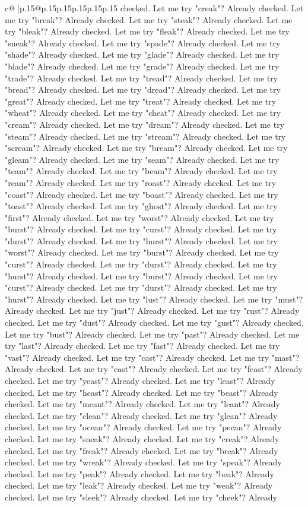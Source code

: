 \documentclass{article}
\begin{document}
{\begin{supertabular}{c@{$\;$}|p{.15\linewidth}@{}p{.15\linewidth}p{.15\linewidth}p{.15\linewidth}p{.15\linewidth}p{.15\linewidth}}
{{{checked. Let me try "creak"? Already checked. Let me try "break"? Already checked. Let me try "steak"? Already checked. Let me try "bleak"? Already checked. Let me try "fleak"? Already checked. Let me try "sneak"? Already checked. Let me try "spade"? Already checked. Let me try "shade"? Already checked. Let me try "glade"? Already checked. Let me try "blade"? Already checked. Let me try "grade"? Already checked. Let me try "trade"? Already checked. Let me try "tread"? Already checked. Let me try "bread"? Already checked. Let me try "dread"? Already checked. Let me try "great"? Already checked. Let me try "treat"? Already checked. Let me try "wheat"? Already checked. Let me try "cheat"? Already checked. Let me try "cream"? Already checked. Let me try "dream"? Already checked. Let me try "steam"? Already checked. Let me try "stream"? Already checked. Let me try "scream"? Already checked. Let me try "bream"? Already checked. Let me try "gleam"? Already checked. Let me try "seam"? Already checked. Let me try "team"? Already checked. Let me try "beam"? Already checked. Let me try "ream"? Already checked. Let me try "roast"? Already checked. Let me try "coast"? Already checked. Let me try "boast"? Already checked. Let me try "toast"? Already checked. Let me try "ghost"? Already checked. Let me try "first"? Already checked. Let me try "worst"? Already checked. Let me try "burst"? Already checked. Let me try "curst"? Already checked. Let me try "durst"? Already checked. Let me try "hurst"? Already checked. Let me try "worst"? Already checked. Let me try "burst"? Already checked. Let me try "curst"? Already checked. Let me try "durst"? Already checked. Let me try "hurst"? Already checked. Let me try "burst"? Already checked. Let me try "curst"? Already checked. Let me try "durst"? Already checked. Let me try "hurst"? Already checked. Let me try "lust"? Already checked. Let me try "must"? Already checked. Let me try "just"? Already checked. Let me try "rust"? Already checked. Let me try "dust"? Already checked. Let me try "gust"? Already checked. Let me try "bust"? Already checked. Let me try "past"? Already checked. Let me try "last"? Already checked. Let me try "fast"? Already checked. Let me try "vast"? Already checked. Let me try "cast"? Already checked. Let me try "mast"? Already checked. Let me try "east"? Already checked. Let me try "feast"? Already checked. Let me try "yeast"? Already checked. Let me try "least"? Already checked. Let me try "heast"? Already checked. Let me try "beast"? Already checked. Let me try "meant"? Already checked. Let me try "leant"? Already checked. Let me try "clean"? Already checked. Let me try "glean"? Already checked. Let me try "ocean"? Already checked. Let me try "pecan"? Already checked. Let me try "sneak"? Already checked. Let me try "creak"? Already checked. Let me try "freak"? Already checked. Let me try "break"? Already checked. Let me try "wreak"? Already checked. Let me try "speak"? Already checked. Let me try "peak"? Already checked. Let me try "beak"? Already checked. Let me try "leak"? Already checked. Let me try "weak"? Already checked. Let me try "sleek"? Already checked. Let me try "cheek"? Already }}}
\end{supertabular}}
\end{document}
